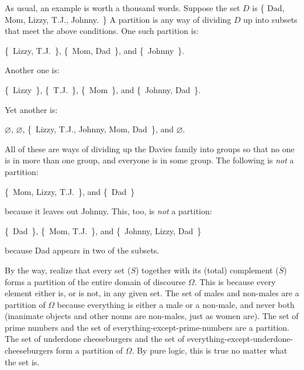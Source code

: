 As usual, an example is worth a thousand words. 
Suppose the set $D$ is \{ Dad, Mom, Lizzy, T.J., Johnny.~\} A
partition is any way of dividing $D$ up into subsets that meet the above
conditions. One such partition is:

\begin{center}
\{~Lizzy, T.J.~\},
\{~Mom, Dad~\}, and
\{~Johnny~\}.
\end{center}

Another one is:

\begin{center}
\{~Lizzy~\},
\{~T.J.~\},
\{~Mom~\}, and
\{~Johnny, Dad~\}.
\end{center}

Yet another is:

\begin{center}
$\varnothing$,
$\varnothing$,
\{~Lizzy, T.J., Johnny, Mom, Dad~\}, and
$\varnothing$.
\end{center}

All of these are ways of dividing up the Davies family into groups so that
no one is in more than one group, and everyone is in some group. The
following is \textit{not} a partition:

\begin{center}
\{~Mom, Lizzy, T.J.~\}, and
\{~Dad~\}
\end{center}

because it leaves out Johnny. This, too, is \textit{not} a partition:

\begin{center}
\{~Dad~\}, 
\{~Mom, T.J.~\}, and
\{~Johnny, Lizzy, Dad~\}
\end{center}

because Dad appears in two of the subsets.

By the way, realize that every set ($S$) together with its (total)
complement ($\overline{S}$) forms a partition of the entire domain of
discourse $\Omega$.  This is because
every element either is, or is not, in any given set. The set of males and
non-males are a partition of $\Omega$ because everything is either a male
or a non-male, and never both (inanimate objects and other nouns are
non-males, just as women are). The set of prime numbers and the set of
everything-except-prime-numbers are a partition. The set of underdone
cheeseburgers and the set of everything-except-underdone-cheeseburgers form
a partition of $\Omega$.  By pure logic, this is true no matter what the
set is.

